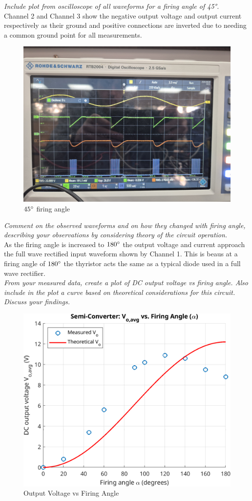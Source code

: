 \documentclass[12pt,a4paper]{article}
\begin{document}
\textit{Include plot from oscilloscope of all waveforms for a firing angle of 45°.}\\

Channel 2 and Channel 3 show the negative output voltage and output current respectively as their ground and positive connections are inverted due to needing a common ground point for all measurements. 
\begin{figure}[H]
        \centering
	\includegraphics[width=0.7\columnwidth]{Images/20250828_143455.jpg}
	\caption{$45\degree$ firing angle}
	\label{fig:45 degree firing angle}
\end{figure}

\textit{Comment on the observed waveforms and on how they changed with firing angle, describing your observations by considering theory of the circuit operation.}\\

As the firing angle is increased to $180\degree$ the output voltage and current approach the full wave rectified input waveform shown by Channel 1. This is beaus at a firing angle of $180\degree$ the thyristor acts the same as a typical diode used in a full wave rectifier.\\

\textit{From your measured data, create a plot of DC output voltage vs firing angle. Also include in the plot a curve based on theoretical considerations for this circuit. Discuss your findings.}\\

\begin{figure}[H]
        \centering
	\includegraphics[width=0.7\columnwidth]{Images/semi_converter_correct.png}
	\caption{Output Voltage vs Firing Angle}
	\label{fig:output voltage vs firing angle}
\end{figure}
\end{document}

